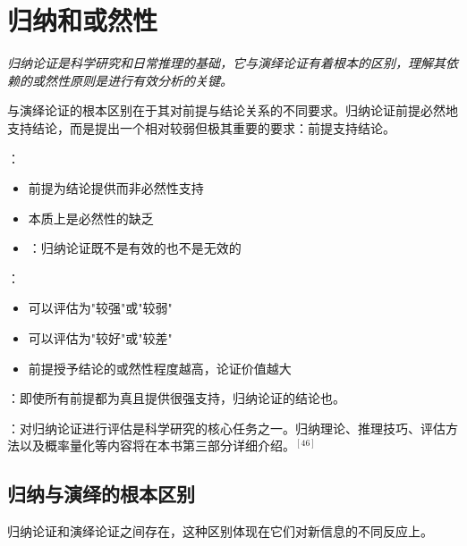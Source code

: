 \section{归纳和或然性}

\begin{logicbox}[title=引言]
\textit{归纳论证是科学研究和日常推理的基础，它与演绎论证有着根本的区别，理解其依赖的或然性原则是进行有效分析的关键。}
\end{logicbox}

与演绎论证的根本区别在于其对前提与结论关系的不同要求。归纳论证前提必然地支持结论，而是提出一个相对较弱但极其重要的要求：前提支持结论。

\begin{theorembox}[title=归纳论证的基本特征]
：
\begin{itemize}
  \item 前提为结论提供而非必然性支持
  \item {}本质上是必然性的缺乏
  \item {}：归纳论证既不是有效的也不是无效的
\end{itemize}

：
\begin{itemize}
  \item 可以评估为"较强"或"较弱"
  \item 可以评估为"较好"或"较差"
  \item 前提授予结论的或然性程度越高，论证价值越大
\end{itemize}

：即使所有前提都为真且提供很强支持，归纳论证的结论也。
\end{theorembox}

：对归纳论证进行评估是科学研究的核心任务之一。归纳理论、推理技巧、评估方法以及概率量化等内容将在本书第三部分详细介绍。$^{[46]}$

\subsection{归纳与演绎的根本区别}

归纳论证和演绎论证之间存在，这种区别体现在它们对新信息的不同反应上。

